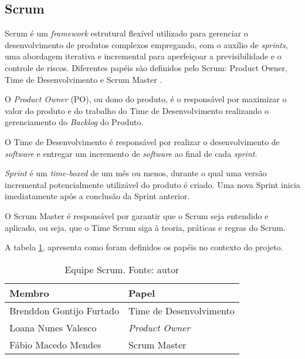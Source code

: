     \subsection{Scrum}
    Scrum é um \textit{framework} estrutural flexível utilizado
    para gerenciar o desenvolvimento de produtos complexos empregando, com o auxílio de \textit{sprints}, uma abordagem iterativa
    e incremental para aperfeiçoar a previsibilidade e o controle de riscos. Diferentes papéis são definidos pelo Scrum: Product Owner, Time de Desenvolvimento e Scrum Master \cite{scrum_guide}.

    O \textit{Product Owner} (PO), ou dono do produto, é o responsável por maximizar o valor
    do produto e do trabalho do Time de Desenvolvimento realizando o gerenciamento
    do \textit{Backlog} do Produto.

    O Time de Desenvolvimento é responsável por realizar o desenvolvimento de \textit{software} e entregar um incremento de \textit{software} ao final de cada \textit{sprint}.

    \textit{Sprint} é um \textit{time-boxed} de um mês ou menos, durante o qual
    uma versão incremental potencialmente utilizável do produto é criado.
    Uma nova Sprint inicia imediatamente após a conclusão da Sprint anterior.

    O Scrum Master é responsável por garantir que o Scrum seja entendido e aplicado, ou seja, que o Time Scrum siga à teoria, práticas e regras do Scrum.

    A tabela \ref{equipe_scrum}, apresenta como foram definidos os papéis no contexto do projeto.

    \begin{table}[!htbp]
        \centering
        \caption{Equipe Scrum. Fonte: autor}
        \label{equipe_scrum}
        \begin{tabular}{|p{5cm}|p{4cm}|}
        \hline
        \textbf{Membro}                                                           & \textbf{Papel}        \\\hline
        Brenddon Gontijo Furtado                                                  & Time de Desenvolvimento \\\hline
        Loana Nunes Valesco                                                       & \textit{Product Owner}    \\\hline
        Fábio Macedo Mendes                                                       & Scrum Master    \\\hline
        \end{tabular}
    \end{table}

